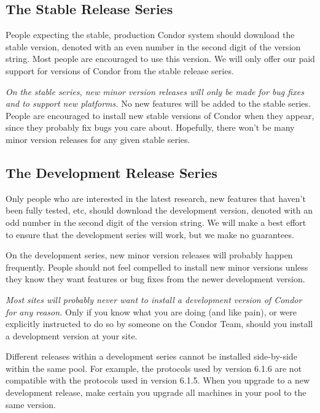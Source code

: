 \subsection{\label{sec:Stable-Series}The Stable Release Series}

People expecting the stable, production Condor system should download
the stable version, denoted with an even number in the second digit of
the version string.
Most people are encouraged to use this version.  
We will only offer our paid support for versions of Condor from the
stable release series.

\emph{On the stable series, new minor version releases will only
be made for bug fixes and to support new platforms.}
No new features will be added to the stable series.
People are encouraged to install new stable versions of Condor when
they appear, since they probably fix bugs you care about.
Hopefully, there won't be many minor version releases for any given
stable series.


\subsection{\label{sec:Developement-Series}
The Development Release Series}

Only people who are interested in the latest research, new features
that haven't been fully tested, etc, should download the development
version, denoted with an odd number in the second digit of the version
string.  
We will make a best effort to ensure that the development series will
work, but we make no guarantees.

On the development series, new minor version releases will probably
happen frequently.
People should not feel compelled to install new minor versions unless
they know they want features or bug fixes from the newer development
version.

\emph{Most sites will probably never want to install a development
version of Condor for any reason.}
Only if you know what you are doing (and like pain), or were
explicitly instructed to do so by someone on the Condor Team, should
you install a development version at your site.

\Note Different releases within a development series cannot be
installed side-by-side within the same pool. 
For example, the protocols used by version 6.1.6 are not compatible with the
protocols used in version 6.1.5.  
When you upgrade to a new development release, make certain you upgrade all
machines in your pool to the same version.

